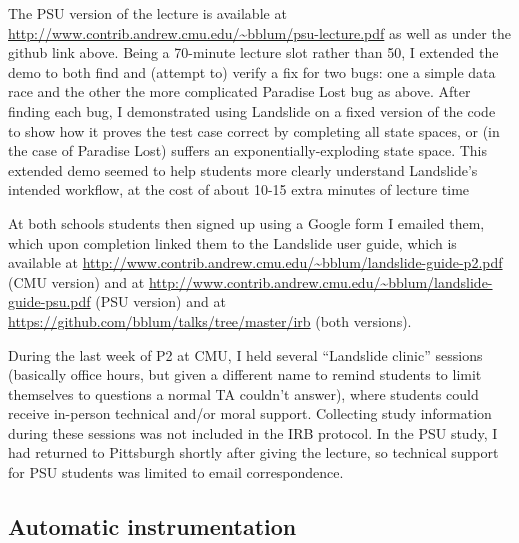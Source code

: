 The PSU version of the lecture
is available at
\url{http://www.contrib.andrew.cmu.edu/~bblum/psu-lecture.pdf}
as well as under the github link above.
Being a 70-minute lecture slot rather than 50, I extended the demo to
both find and (attempt to) verify a fix for two bugs:
one a simple data race and the other the more complicated Paradise Lost bug as above.
After finding each bug, I demonstrated using Landslide on a fixed version of the code
to show how it proves the test case correct by completing all state spaces,
or (in the case of Paradise Lost) suffers an exponentially-exploding state space.
This extended demo seemed to help students more clearly understand Landslide's intended workflow,
at the cost of about 10-15 extra minutes of lecture time

At both schools students then signed up using a Google form I emailed them,
which upon completion linked them to the Landslide user guide,
which is available at
\url{http://www.contrib.andrew.cmu.edu/~bblum/landslide-guide-p2.pdf}
(CMU version)
and at %
\url{http://www.contrib.andrew.cmu.edu/~bblum/landslide-guide-psu.pdf}
(PSU version)
and at
\url{https://github.com/bblum/talks/tree/master/irb}
(both versions).

During the last week of P2 at CMU, I held several ``Landslide clinic'' sessions
(basically office hours, but given a different name to remind students
to limit themselves to questions a normal TA couldn't answer),
where students could receive in-person technical and/or moral support.
Collecting study information during these sessions was not included in the IRB protocol.
In the PSU study, I had returned to Pittsburgh shortly after giving the lecture,
so technical support for PSU students was limited to email correspondence.

\subsection{Automatic instrumentation}
\label{sec:education-pebbles-instrumentation}

